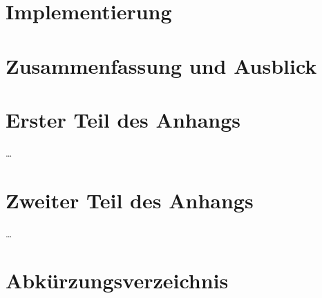 \documentclass[twoside,bibliography=totoc,openany]{fumi}
\begin{document}
\chapter{Implementierung}



\chapter{Zusammenfassung und Ausblick}



\appendix

\chapter{Erster Teil des Anhangs}
\dots

\chapter{Zweiter Teil des Anhangs}
\dots




\backmatter
\pagestyle{fancyclear}



{\footnotesize\flushleft\setlength{\itemsep}{-3pt}%

}
\cleardoublepage


\listoffigures
\cleardoublepage


\listoftables
\cleardoublepage


\renewcommand\lstlistlistingname{Verzeichnis der Auflistungen}
\lstlistoflistings
\cleardoublepage


\renewcommand*\listalgorithmcfname{Verzeichnis der Algorithmen}
\listofalgorithms
\cleardoublepage


\chapter*{Abkürzungsverzeichnis}
\end{document}
